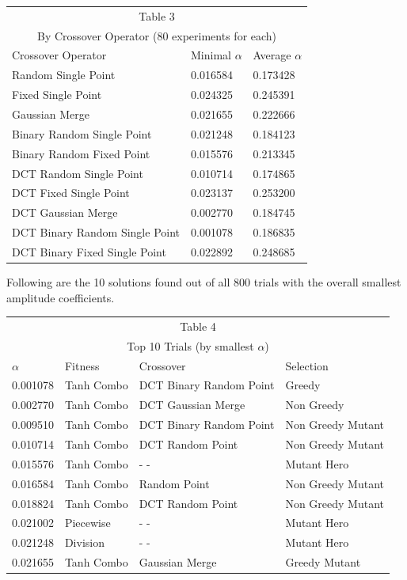 \documentclass[12pt]{article}
\begin{document}
\vspace{20pt}

\begin{tabular}{|p{5cm}|p{2cm}|p{2cm}|}
\hline
\multicolumn{3}{|c|}{Table 3} \\
\multicolumn{3}{|c|}{By Crossover Operator (80 experiments for each)} \\
\hline
Crossover Operator & Minimal $\alpha$ & Average $\alpha$ \\
\hline
\hline
Random Single Point & 0.016584 & 0.173428 \\
\hline
Fixed Single Point & 0.024325 & 0.245391 \\
\hline
Gaussian Merge & 0.021655 & 0.222666 \\
\hline
Binary Random Single Point & 0.021248 & 0.184123 \\
\hline
Binary Random Fixed Point & 0.015576  & 0.213345 \\
\hline
DCT Random Single Point & 0.010714 & 0.174865 \\
\hline
DCT Fixed Single Point & 0.023137  & 0.253200 \\
\hline
DCT Gaussian Merge & 0.002770 & 0.184745 \\
\hline
DCT Binary Random Single Point & 0.001078 & 0.186835 \\
\hline
DCT Binary Fixed Single Point & 0.022892 & 0.248685 \\
\hline
\end{tabular}


\vspace{20pt}

Following are the 10 solutions found out of all 800 trials with the
overall smallest amplitude coefficients.

\vspace{10pt}

\begin{tabular}{|p{1.5cm}|p{3cm}|p{3cm}|p{3cm}|}
\hline
\multicolumn{4}{|c|}{Table 4} \\
\multicolumn{4}{|c|}{Top 10 Trials (by smallest $\alpha$)} \\
\hline
$\alpha$ & Fitness & Crossover & Selection \\
\hline
\hline
0.001078 & Tanh Combo & DCT Binary Random Point & Greedy \\
\hline
0.002770 & Tanh Combo & DCT Gaussian Merge & Non Greedy \\
\hline
0.009510 & Tanh Combo & DCT Binary Random Point & Non Greedy Mutant \\
\hline
0.010714 & Tanh Combo & DCT Random Point & Non Greedy Mutant \\
\hline
0.015576 & Tanh Combo & - - & Mutant Hero \\
\hline
0.016584 & Tanh Combo & Random Point & Non Greedy Mutant \\
\hline
0.018824 & Tanh Combo & DCT Random Point & Non Greedy Mutant \\
\hline
0.021002 & Piecewise &  - - & Mutant Hero \\
\hline
0.021248 & Division &  - - & Mutant Hero \\
\hline
0.021655 & Tanh Combo & Gaussian Merge & Greedy Mutant \\
\hline
\end{tabular}
\end{document}
